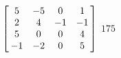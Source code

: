 {$\left[\hskip -3pt \begin{array}{cccc} 5&-5&0&1\\  2&4&-1&-1
\\  5&0&0&4\\  -1&-2&0&5\end{array}\hskip -3pt \right]$} 
{$175$}



  

